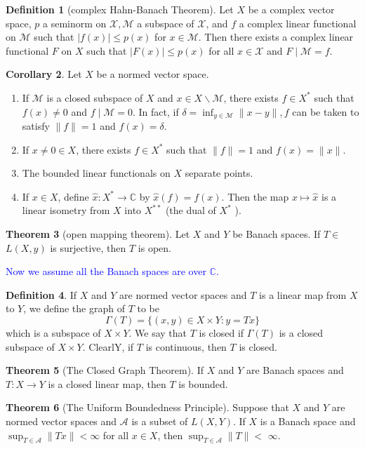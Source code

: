 \documentclass[12pt,a4paper]{book}
\newcommand{\bb}[1]{\mathbb{#1}}
\newcommand{\blue}[1]{\textcolor{blue}{#1}}
\newenvironment{enu}{\begin{enumerate}[(1)]}{\end{enumerate}}
\theoremstyle{definition}
\newtheorem{defn}{Definition}[section]
\newtheorem{coro}[defn]{Corollary}
\newtheorem{theo}[defn]{Theorem}
\begin{document}
\begin{defn}[complex Hahn-Banach Theorem]
    Let $X$ be a complex vector space, $p$ a seminorm on $\mathcal{X}, \mathcal{M}$ a subspace of $\mathcal{X}$, and $f$ a complex linear functional on $\mathcal{M}$ such that $|f(x)| \leq p(x)$ for $x \in \mathcal{M}$. Then there exists a complex linear functional $F$ on $X$ such that $|F(x)| \leq p(x)$ for all $x \in \mathcal{X}$ and $F \mid \mathcal{M}=f$.
\end{defn}
\begin{coro}
    Let $X$ be a normed vector space.
    \begin{enu}
    \item If $\mathcal{M}$ is a closed subspace of $X$ and $x \in X \backslash \mathcal{M}$, there exists $f \in X^*$ such that $f(x) \neq 0$ and $f \mid \mathcal{M}=0$. In fact, if $\delta=\inf _{y \in \mathcal{M}}\|x-y\|, f$ can be taken to satisfy $\|f\|=1$ and $f(x)=\delta$.
    \item If $x \neq 0 \in X$, there exists $f \in X^*$ such that $\|f\|=1$ and $f(x)=\|x\|$.
    \item The bounded linear functionals on $X$ separate points.
    \item If $x \in X$, define $\widehat{x}: X^* \rightarrow \mathbb{C}$ by $\widehat{x}(f)=f(x)$. Then the map $x \mapsto \widehat{x}$ is a linear isometry from $X$ into $X^{* *}$ (the dual of $X^*$ ).
    \end{enu}
\end{coro}
\begin{theo}[open mapping theorem]
    Let $X$ and $Y$ be Banach spaces. If $T \in$ $L(X, y)$ is surjective, then $T$ is open.
\end{theo}

\blue{Now we assume all the Banach spaces are over $\bb{C}$.}
\begin{defn}
    If $X$ and $Y$ are normed vector spaces and $T$ is a linear map from $X$ to $Y$, we define the graph of $T$ to be
    $$
    \Gamma(T)=\{(x,y) \in X \times Y: y=Tx\}
    $$
    which is a subspace of $X \times Y$. We say that $T$ is closed if $\Gamma(T)$ is a closed subspace of $X \times Y$. ClearlY, if $T$ is continuous, then $T$ is closed.
\end{defn}
\begin{theo}[The Closed Graph Theorem]
    If $X$ and $Y$ are Banach spaces and $T: X \rightarrow Y$ is a closed linear map, then $T$ is bounded.
\end{theo}
\begin{theo}[The Uniform Boundedness Principle]
    Suppose that $X$ and $Y$ are normed vector spaces and $\mathcal{A}$ is a subset of $L(X, Y)$.
If $X$ is a Banach space and $\sup _{T \in \mathcal{A}}\|T x\|<\infty$ for all $x \in X$, then $\sup _{T \in \mathcal{A}}\|T\|<$ $\infty$.

\end{theo}
\end{document}
